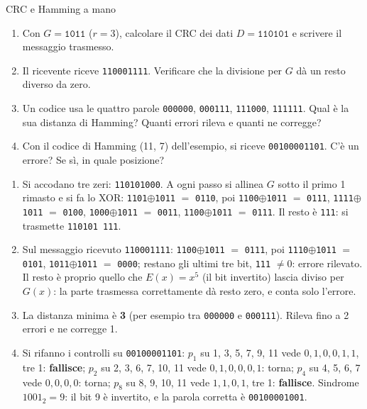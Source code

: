 \begin{esercizio}{CRC e Hamming a mano}
\begin{enumerate}[label=(\alph*)]
    \item Con $G = \texttt{1011}$ ($r = 3$), calcolare il CRC dei dati $D = \texttt{110101}$ e scrivere il messaggio trasmesso.
    \item Il ricevente riceve \texttt{110\textcolor{netred}{0}01111}. Verificare che la divisione per $G$ dà un resto diverso da zero.
    \item Un codice usa le quattro parole \texttt{000000}, \texttt{000111}, \texttt{111000}, \texttt{111111}. Qual è la sua distanza
          di Hamming? Quanti errori rileva e quanti ne corregge?
    \item Con il codice di Hamming (11, 7) dell'esempio, si riceve \texttt{00100001101}. C'è un errore? Se sì, in quale posizione?
\end{enumerate}

\svolgimento
\begin{enumerate}[label=(\alph*)]
    \item Si accodano tre zeri: \texttt{110101000}. A ogni passo si allinea $G$ sotto il primo 1 rimasto e si fa lo XOR:
          \texttt{1101}$\oplus$\texttt{1011} $=$ \texttt{0110}, poi \texttt{1100}$\oplus$\texttt{1011} $=$ \texttt{0111},
          \texttt{1111}$\oplus$\texttt{1011} $=$ \texttt{0100}, \texttt{1000}$\oplus$\texttt{1011} $=$ \texttt{0011},
          \texttt{1100}$\oplus$\texttt{1011} $=$ \texttt{0111}. Il resto è \texttt{111}: si trasmette \texttt{110101\,111}.
    \item Sul messaggio ricevuto \texttt{110001111}: \texttt{1100}$\oplus$\texttt{1011} $=$ \texttt{0111}, poi
          \texttt{1110}$\oplus$\texttt{1011} $=$ \texttt{0101}, \texttt{1011}$\oplus$\texttt{1011} $=$ \texttt{0000}; restano gli
          ultimi tre bit, \texttt{111} $\neq 0$: errore rilevato. Il resto è proprio quello che $E(x) = x^5$ (il bit invertito)
          lascia diviso per $G(x)$: la parte trasmessa correttamente dà resto zero, e conta solo l'errore.
    \item La distanza minima è \textbf{3} (per esempio tra \texttt{000000} e \texttt{000111}). Rileva fino a 2 errori e ne corregge 1.
    \item Si rifanno i controlli su \texttt{00100001101}: $p_1$ su 1, 3, 5, 7, 9, 11 vede $0,1,0,0,1,1$, tre 1: \textbf{fallisce};
          $p_2$ su 2, 3, 6, 7, 10, 11 vede $0,1,0,0,0,1$: torna; $p_4$ su 4, 5, 6, 7 vede $0,0,0,0$: torna; $p_8$ su 8, 9, 10, 11
          vede $1,1,0,1$, tre 1: \textbf{fallisce}. Sindrome $1001_2 = 9$: il bit 9 è invertito, e la parola corretta è
          \texttt{00100001001}.
\end{enumerate}
\end{esercizio}


